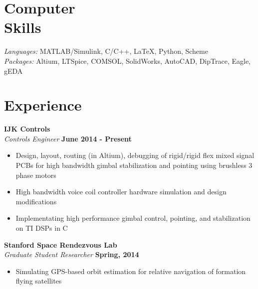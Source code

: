 \documentclass[margin,line]{resume}
\begin{document}
\begin{resume}
    \section{\mysidestyle Computer\\ Skills}

    \textsl{Languages:} MATLAB/Simulink, C/C++, \LaTeX , Python, Scheme\\
    \textsl{Packages:} Altium, LTSpice, COMSOL, SolidWorks, AutoCAD, DipTrace, Eagle, gEDA%


    \section{\mysidestyle Experience}

    \textbf{IJK Controls}\\
    \textsl{Controls Engineer} \hfill \textbf{June 2014 - Present}\\ \vspace{-4mm}
    \begin{itemize} \itemsep -2pt
        \item Design, layout, routing (in Altium), debugging of rigid/rigid flex mixed signal PCBs for high bandwidth gimbal stabilization and pointing using brushless 3 phase motors
        \item High bandwidth voice coil controller hardware simulation and design modifications
        \item Implementating high performance gimbal control, pointing, and stabilization on TI DSPs in C
    \end{itemize} \vspace{-2.25mm}

    \textbf{Stanford Space Rendezvous Lab}\\
    \textsl{Graduate Student Researcher} \hfill \textbf{Spring, 2014}\\ \vspace{-4mm}
    \begin{itemize} \itemsep -2pt
        \item Simulating GPS-based orbit estimation for relative navigation of formation flying satellites
    \end{itemize} \vspace{-2.25mm}


\end{resume}
\end{document}
